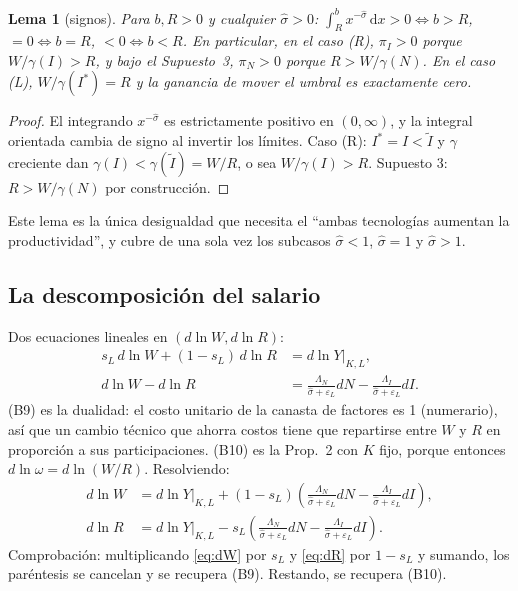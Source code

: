 \documentclass[11pt,a4paper]{article}
\theoremstyle{definition}
\theoremstyle{plain}
\newtheorem{lema}[definicion]{Lema}
\theoremstyle{remark}
\numberwithin{equation}{section}
\newcommand{\sh}{\hat\sigma}
\newcommand{\It}{\tilde I}
\newcommand{\Is}{I^{*}}
\newcommand{\dd}{\,\mathrm{d}}
\newcommand{\eps}{\varepsilon}
\begin{document}
\begin{lema}[signos]\label{lem:signos}
Para $b,R>0$ y cualquier $\sh>0$: $\int_R^{b}x^{-\sh}\dd x>0\iff b>R$, $=0\iff b=R$, $<0\iff b<R$.
En particular, en el caso (R), $\pi_I>0$ porque $W/\gamma(I)>R$, y bajo el Supuesto~3, $\pi_N>0$ porque $R>W/\gamma(N)$.
En el caso (L), $W/\gamma(\Is)=R$ y la ganancia de mover el umbral es exactamente cero.
\end{lema}
\begin{proof}
El integrando $x^{-\sh}$ es estrictamente positivo en $(0,\infty)$, y la integral orientada cambia de signo al
invertir los límites. Caso (R): $\Is=I<\It$ y $\gamma$ creciente dan $\gamma(I)<\gamma(\It)=W/R$, o sea
$W/\gamma(I)>R$. Supuesto 3: $R>W/\gamma(N)$ por construcción.
\end{proof}
\noindent Este lema es la única desigualdad que necesita el ``ambas tecnologías aumentan la productividad'', y cubre de
una sola vez los subcasos $\sh<1$, $\sh=1$ y $\sh>1$.

\subsection{La descomposición del salario}
Dos ecuaciones lineales en $(d\ln W,d\ln R)$:
\begin{align}
  s_L\,d\ln W+(1-s_L)\,d\ln R&=d\ln Y|_{K,L}, \tag{B9}\\
  d\ln W-d\ln R&=\frac{\Lambda_N}{\sh+\eps_L}dN-\frac{\Lambda_I}{\sh+\eps_L}dI. \tag{B10}
\end{align}
(B9) es la dualidad: el costo unitario de la canasta de factores es 1 (numerario), así que un cambio técnico que
ahorra costos tiene que repartirse entre $W$ y $R$ en proporción a sus participaciones. (B10) es la Prop.~2 con $K$
fijo, porque entonces $d\ln\omega=d\ln(W/R)$. Resolviendo:
\begin{align}
  d\ln W&=d\ln Y|_{K,L}+(1-s_L)\left(\frac{\Lambda_N}{\sh+\eps_L}dN-\frac{\Lambda_I}{\sh+\eps_L}dI\right),\label{eq:dW}\\
  d\ln R&=d\ln Y|_{K,L}-s_L\left(\frac{\Lambda_N}{\sh+\eps_L}dN-\frac{\Lambda_I}{\sh+\eps_L}dI\right).\label{eq:dR}
\end{align}
Comprobación: multiplicando \eqref{eq:dW} por $s_L$ y \eqref{eq:dR} por $1-s_L$ y sumando, los paréntesis se cancelan
y se recupera (B9). Restando, se recupera (B10).
\end{document}
